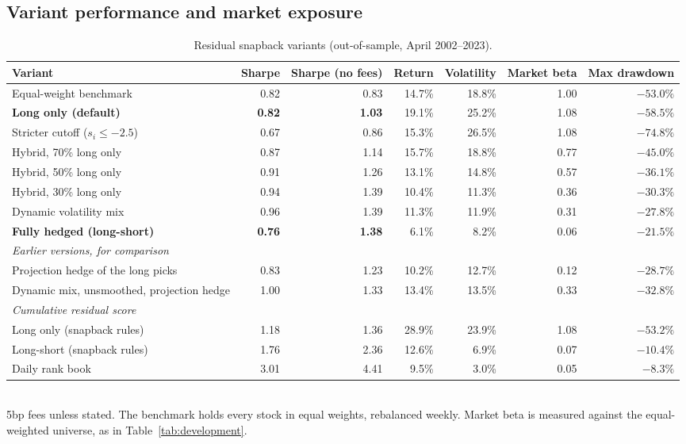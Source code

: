 \documentclass[11pt,letterpaper]{article}
\begin{document}
\subsection{Variant performance and market exposure}
\begin{table}[!htbp]
    \centering
    \caption{Residual snapback variants (out-of-sample, April 2002--2023).}
    \label{tab:snapback-variants}
    \begin{adjustbox}{max width=\linewidth}
        \begin{tabular}{lrrrrrr}
            \toprule
            Variant & Sharpe & Sharpe (no fees) & Return & Volatility & Market beta & Max drawdown \\
            \midrule
            Equal-weight benchmark & 0.82 & 0.83 & 14.7\% & 18.8\% & 1.00 & $-53.0\%$ \\
            \textbf{Long only (default)} & \textbf{0.82} & \textbf{1.03} & 19.1\% & 25.2\% & 1.08 & $-58.5\%$ \\
            Stricter cutoff ($s_i \le -2.5$) & 0.67 & 0.86 & 15.3\% & 26.5\% & 1.08 & $-74.8\%$ \\
            Hybrid, 70\% long only & 0.87 & 1.14 & 15.7\% & 18.8\% & 0.77 & $-45.0\%$ \\
            Hybrid, 50\% long only & 0.91 & 1.26 & 13.1\% & 14.8\% & 0.57 & $-36.1\%$ \\
            Hybrid, 30\% long only & 0.94 & 1.39 & 10.4\% & 11.3\% & 0.36 & $-30.3\%$ \\
            Dynamic volatility mix & 0.96 & 1.39 & 11.3\% & 11.9\% & 0.31 & $-27.8\%$ \\
            \textbf{Fully hedged (long-short)} & \textbf{0.76} & \textbf{1.38} & 6.1\% & 8.2\% & 0.06 & $-21.5\%$ \\
            \midrule
            \multicolumn{7}{l}{\emph{Earlier versions, for comparison}} \\
            Projection hedge of the long picks & 0.83 & 1.23 & 10.2\% & 12.7\% & 0.12 & $-28.7\%$ \\
            Dynamic mix, unsmoothed, projection hedge & 1.00 & 1.33 & 13.4\% & 13.5\% & 0.33 & $-32.8\%$ \\
            \midrule
            \multicolumn{7}{l}{\emph{Cumulative residual score}} \\
            Long only (snapback rules) & 1.18 & 1.36 & 28.9\% & 23.9\% & 1.08 & $-53.2\%$ \\
            Long-short (snapback rules) & 1.76 & 2.36 & 12.6\% & 6.9\% & 0.07 & $-10.4\%$ \\
            Daily rank book & 3.01 & 4.41 & 9.5\% & 3.0\% & 0.05 & $-8.3\%$ \\
            \bottomrule
        \end{tabular}
    \end{adjustbox}
    \\[4pt]
    \small 5bp fees unless stated. The benchmark holds every stock in equal weights, rebalanced
    weekly. Market beta is measured against the equal-weighted universe, as in
    Table~\ref{tab:development}.
\end{table}
\end{document}
